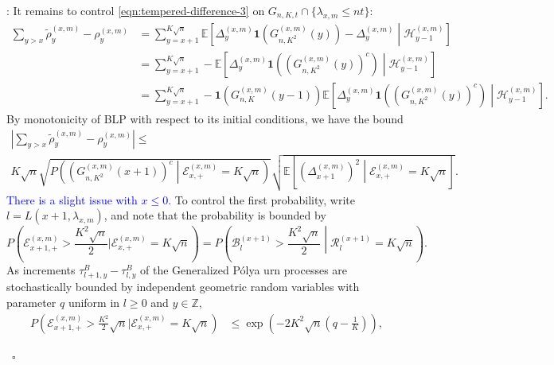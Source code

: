 \documentclass[twoside,12pt,a4paper]{article}
\numberwithin{equation}{section}
\newenvironment{proof}[1][Proof]{{\sc #1}:}{~\hfill $\square$}
\newcommand{\comment}[1]{\textcolor{blue}{#1}}
\begin{document}
\begin{proof}[Proof of Lemma~\ref{lm: approx local drift by conditional means}]
		It remains to control  \eqref{eqn:tempered-difference-3} on $G_{n, K, t} \cap \{\lambda_{x,m} \leq nt \}$:
		\begin{align*}
			\sum_{y > x} \tilde\rho_y^{(x,m)} - \rho_y^{(x,m)}
			&= \sum_{y = x + 1}^{K \sqrt{n} } \mathbb{E}\left[ \Delta_y^{(x,m)}\mathbf{1}\left( G_{n, K^2}^{(x,m)}(y) \right) - \Delta_{y}^{(x,m)} \middle| \mathcal{H}_{y-1}^{(x,m)}  \right]  \\
			&= \sum_{y = x + 1}^{K \sqrt{n} } -\mathbb{E}\left[ \Delta_y^{(x,m)}\mathbf{1}\left( \left( G_{n, K^2}^{(x,m)}(y) \right) ^c \right) \middle| \mathcal{H}_{y-1}^{(x,m)}  \right]  \\
			&= \sum_{y = x + 1}^{K \sqrt{n} } -\mathbf{1}\left(G_{n, K}^{(x,m)}(y-1)\right) \mathbb{E}\left[ \Delta_y^{(x,m)}\mathbf{1}\left( \left( G_{n, K^2}^{(x,m)}(y) \right) ^c \right) \middle| \mathcal{H}_{y-1}^{(x,m)}  \right] 
			.\end{align*}
		By monotonicity of BLP with respect to its initial conditions, we have the bound
		\begin{multline*}
			\left| \sum_{y > x} \tilde\rho_y^{(x,m)} - \rho_y^{(x,m)} \right| \le \\
			K \sqrt{n} 
			\sqrt{ P\left( \left( G^{(x,m)}_{n, K^2}(x+1) \right) ^{c} \middle| \mathcal{E}_{x,+}^{(x,m)} = K \sqrt{n}  \right) }
			\sqrt{ \mathbb{E}\left[ \left(\Delta_{x+1}^{(x,m)}\right)^2 \middle| \mathcal{E}_{x,+}^{(x,m)} = K \sqrt{n}  \right]}
			.\end{multline*}
		\comment{There is a slight issue with $x\leq 0$.}
		To control the first probability, write $l = L\left( x+1, \lambda_{x, m} \right) $, and note that the probability is bounded by 
		\[
		P\left(\mathcal{E}_{x+1,+}^{(x,m)} > \frac{K^2 \sqrt{n} }{2} | \mathcal{E}_{x,+}^{(x, m)} = K \sqrt{n}\right)
		= P\left(\mathcal{B}^{(x+1)}_{l} > \frac{K^2 \sqrt{n} }{2}  \middle| \mathcal{R}^{(x + 1)}_l = K \sqrt{n}  \right)
		.\] 
		As increments $\tau^B_{l+1,y} -\tau^B_{l,y}$ of the Generalized  P\'{o}lya urn processes are stochastically bounded by independent geometric random variables with parameter $q$ uniform in $l\geq 0$ and $y \in \mathbb{Z}$, 
		\begin{align*}
			P(\mathcal{E}_{x+1,+}^{(x,m)} > \frac{K^2}{2} \sqrt{n} | \mathcal{E}_{x,+}^{(x, m)} = K \sqrt{n})
			&\le \exp\left( - 2 K^2 \sqrt{n}(q - \frac{1}{K})  \right) 
			,
		\end{align*}

\end{proof}
\end{document}
